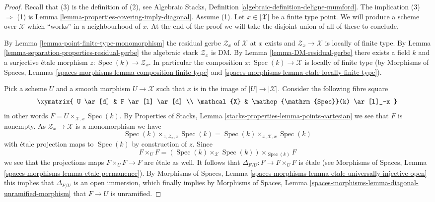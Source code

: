 \documentclass{stacks-project}
\theoremstyle{plain}
\theoremstyle{definition}
\theoremstyle{remark}
\numberwithin{equation}{subsection}
\def\Spec{\mathop{\mathrm{Spec}}}
\begin{document}
\begin{proof}
Recall that (3) is the definition of (2), see
Algebraic Stacks, Definition \ref{algebraic-definition-deligne-mumford}.
The implication (3) $\Rightarrow$ (1) is
Lemma \ref{lemma-properties-covering-imply-diagonal}.
Assume (1). Let $x \in |\mathcal{X}|$ be a finite type point.
We will produce a scheme over $\mathcal{X}$ which ``works'' in a
neighbourhood of $x$. At the end of the proof we will take the disjoint
union of all of these to conclude.

\medskip\noindent
By
Lemma \ref{lemma-point-finite-type-monomorphism}
the residual gerbe $\mathcal{Z}_x$ of $\mathcal{X}$ at $x$ exists and
$\mathcal{Z}_x \to \mathcal{X}$ is locally of finite type. By
Lemma \ref{lemma-separation-properties-residual-gerbe}
the algebraic stack $\mathcal{Z}_x$ is DM. By
Lemma \ref{lemma-DM-residual-gerbe}
there exists a field $k$ and a surjective \'etale morphism
$z : \Spec(k) \to \mathcal{Z}_x$.
In particular the composition $x : \Spec(k) \to \mathcal{X}$
is locally of finite type (by
Morphisms of Spaces, Lemmas
\ref{spaces-morphisms-lemma-composition-finite-type} and
\ref{spaces-morphisms-lemma-etale-locally-finite-type}).

\medskip\noindent
Pick a scheme $U$ and a smooth morphism $U \to \mathcal{X}$ such that
$x$ is in the image of $|U| \to |\mathcal{X}|$.
Consider the following fibre square
$$
\xymatrix{
U \ar[d] & F  \ar[l] \ar[d] \\
\mathcal{X} & \Spec(k) \ar[l]_-x
}
$$
in other words $F = U \times_{\mathcal{X}, x} \Spec(k)$. By
Properties of Stacks, Lemma \ref{stacks-properties-lemma-points-cartesian}
we see that $F$ is nonempty.
As $\mathcal{Z}_x \to \mathcal{X}$ is a monomorphism we have
$$
\Spec(k) \times_{z, \mathcal{Z}_x, z} \Spec(k)
=
\Spec(k) \times_{x, \mathcal{X}, x} \Spec(k)
$$
with \'etale projection maps to $\Spec(k)$ by construction of $z$.
Since
$$
F \times_U F =
(\Spec(k) \times_\mathcal{X} \Spec(k))
\times_{\Spec(k)} F
$$
we see that the projections maps $F \times_U F \to F$ are \'etale as well.
It follows that $\Delta_{F/U} : F \to F \times_U F$ is \'etale (see
Morphisms of Spaces, Lemma \ref{spaces-morphisms-lemma-etale-permanence}).
By
Morphisms of Spaces, Lemma
\ref{spaces-morphisms-lemma-etale-universally-injective-open}
this implies that $\Delta_{F/U}$ is an open immersion, which finally
implies by
Morphisms of Spaces, Lemma
\ref{spaces-morphisms-lemma-diagonal-unramified-morphism}
that $F \to U$ is unramified.


\end{proof}
\end{document}
